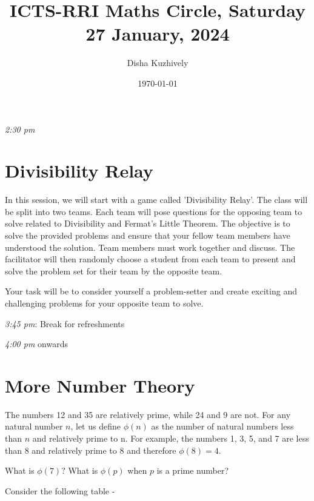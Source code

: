 \documentclass[a4paper,12pt]{article}
\title{ICTS-RRI Maths Circle, Saturday 27 January, 2024}
\author{Disha Kuzhively}
\date{\today}
\begin{document}
\maketitle
\emph{2:30 pm}
\section*{Divisibility Relay}
In this session, we will start with a game called 'Divisibility Relay'. The class will be split into two teams. Each team will pose questions for the opposing team to solve related to Divisibility and Fermat's Little Theorem. The objective is to solve the provided problems and ensure that your fellow team members have understood the solution. Team members must work together and discuss. The facilitator will then randomly choose a student from each team to present and solve the problem set for their team by the opposite team.

Your task will be to consider yourself a problem-setter and create exciting and challenging problems for your opposite team to solve.

\emph{3:45 pm}: Break for refreshments

\emph{4:00 pm} onwards



\section*{More Number Theory}
The numbers 12 and 35 are relatively prime, while 24 and 9 are not. For any natural number $n$, let us define $\phi(n)$ as the number of natural numbers less than $n$ and relatively prime to n. For example, the numbers 1, 3, 5, and 7 are less than 8 and relatively prime to 8 and therefore $\phi(8) = 4$.

What is $\phi(7)?$ What is $\phi(p)$ when $p$ is a prime number?

Consider the following table - 
\end{document}
